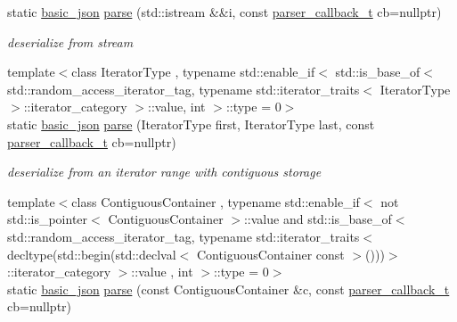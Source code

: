 \begin{DoxyCompactItemize}
static \hyperlink{classnlohmann_1_1basic__json}{basic\+\_\+json} \hyperlink{classnlohmann_1_1basic__json_a959bc32fc72a76cd5a1bd6977926f787}{parse} (std\+::istream \&\&i, const \hyperlink{classnlohmann_1_1basic__json_a9e35475e2027520a78e09f460dbe048a}{parser\+\_\+callback\+\_\+t} cb=nullptr)
\begin{DoxyCompactList}\small\item\em deserialize from stream \end{DoxyCompactList}\item 
{\footnotesize template$<$class Iterator\+Type , typename std\+::enable\+\_\+if$<$                                                              std\+::is\+\_\+base\+\_\+of$<$                                                                              std\+::random\+\_\+access\+\_\+iterator\+\_\+tag,                                                                           typename std\+::iterator\+\_\+traits$<$ Iterator\+Type $>$\+::iterator\+\_\+category $>$\+::value, int $>$\+::type  = 0$>$ }\\static \hyperlink{classnlohmann_1_1basic__json}{basic\+\_\+json} \hyperlink{classnlohmann_1_1basic__json_aa8dca2e91a6301c36890f844e64f0023}{parse} (Iterator\+Type first, Iterator\+Type last, const \hyperlink{classnlohmann_1_1basic__json_a9e35475e2027520a78e09f460dbe048a}{parser\+\_\+callback\+\_\+t} cb=nullptr)
\begin{DoxyCompactList}\small\item\em deserialize from an iterator range with contiguous storage \end{DoxyCompactList}\item 
{\footnotesize template$<$class Contiguous\+Container , typename std\+::enable\+\_\+if$<$                                                              not std\+::is\+\_\+pointer$<$ Contiguous\+Container $>$\+::value and                                                           std\+::is\+\_\+base\+\_\+of$<$                                                                              std\+::random\+\_\+access\+\_\+iterator\+\_\+tag,                                                                           typename std\+::iterator\+\_\+traits$<$ decltype(std\+::begin(std\+::declval$<$ Contiguous\+Container const  $>$()))$>$\+::iterator\+\_\+category $>$\+::value                                                           , int $>$\+::type  = 0$>$ }\\static \hyperlink{classnlohmann_1_1basic__json}{basic\+\_\+json} \hyperlink{classnlohmann_1_1basic__json_aeffd70f622f8f2a51fd3d95af64b63a7}{parse} (const Contiguous\+Container \&c, const \hyperlink{classnlohmann_1_1basic__json_a9e35475e2027520a78e09f460dbe048a}{parser\+\_\+callback\+\_\+t} cb=nullptr)

\end{DoxyCompactItemize}
